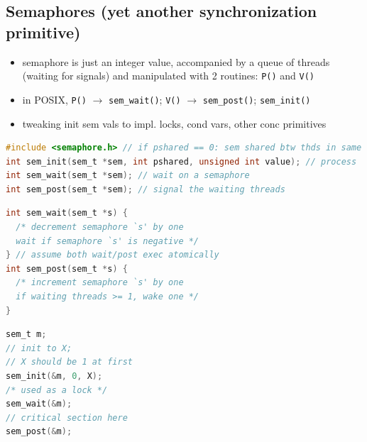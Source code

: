 \documentclass[8pt,a4paper,landscape]{extarticle}
\begin{document}
\pagestyle{empty}

\begin{multicols*}{3}
% 
% 
% 
% 

% 
% 
% 
% 
% 
% 
% 
% 
% 
% 

\section*{Semaphores (yet another synchronization primitive)}
\begin{itemize}
\item semaphore is just an integer value, accompanied by a queue of threads (waiting for signals) and manipulated with 2 routines: \texttt{P()} and \texttt{V()}
\item in POSIX, \texttt{P()} $\to$ \texttt{sem\_wait()}; \texttt{V()} $\to$ \texttt{sem\_post()};  \texttt{sem\_init()}
\item tweaking init sem vals to impl. locks, cond vars, other conc primitives
\end{itemize}
\begin{lstlisting}[language=c]
#include <semaphore.h> // if pshared == 0: sem shared btw thds in same
int sem_init(sem_t *sem, int pshared, unsigned int value); // process
int sem_wait(sem_t *sem); // wait on a semaphore
int sem_post(sem_t *sem); // signal the waiting threads
\end{lstlisting}
\begin{minipage}{0.6\linewidth}
\begin{lstlisting}[language=c]
int sem_wait(sem_t *s) {
  /* decrement semaphore `s' by one
  wait if semaphore `s' is negative */
} // assume both wait/post exec atomically
int sem_post(sem_t *s) {
  /* increment semaphore `s' by one
  if waiting threads >= 1, wake one */
}
\end{lstlisting}
\end{minipage}
\begin{minipage}{0.4\linewidth}
\begin{lstlisting}[language=c,xleftmargin=2pt,xrightmargin=2pt]
sem_t m;
// init to X;
// X should be 1 at first
sem_init(&m, 0, X);
/* used as a lock */
sem_wait(&m);
// critical section here
sem_post(&m);
\end{lstlisting}
\end{minipage}

\end{multicols*}
\end{document}
